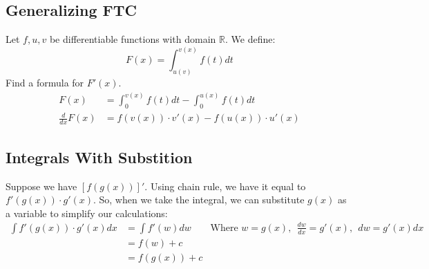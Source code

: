 \documentclass{article}
\begin{document}
\subsection{Generalizing FTC}
Let $f, u, v$ be differentiable functions with domain $\mathbb{R}$. We define:
$$F(x) = \int_{u(v)}^{v(x)} f(t) dt$$
Find a formula for $F'(x)$.
\begin{align*}
    F(x) & = \int_0^{v(x)} f(t) dt - \int_0^{u(x)} f(t) dt\\
    \frac{d}{dx} F(x) & = f(v(x)) \cdot v'(x) - f(u(x)) \cdot u'(x)
\end{align*}

\subsection{Integrals With Substition}
Suppose we have $\left[ f(g(x)) \right]'$. Using chain rule, we have it equal to $f'(g(x)) \cdot g'(x)$. So, when we take the integral, we can substitute $g(x)$ as a variable to simplify our calculations: 
\begin{align*}
    \int f'(g(x)) \cdot g'(x) dx & = \int f'(w) dw & \text{Where } w = g(x), \ \ \frac{dw}{dx} = g'(x), \ \ dw = g'(x) dx\\
    & = f(w) + c\\
    & = f(g(x)) + c
\end{align*}
\end{document}
